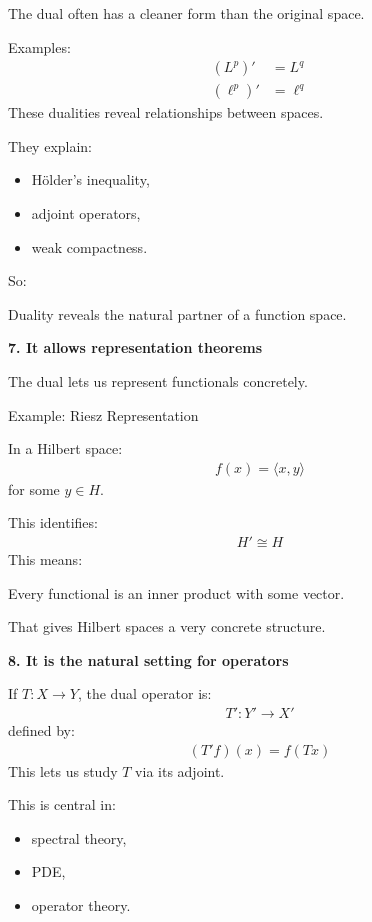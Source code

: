 \begin{description}
The dual often has a cleaner form than the original space.

Examples:
\begin{align*}
(L^p)'&=L^q\\
(\ell^p)'&=\ell^q
\end{align*}
These dualities reveal relationships between spaces.

They explain:
	\begin{itemize}
    \item Hölder’s inequality,
    \item adjoint operators,
    \item weak compactness.
	\end{itemize}

So:

\> Duality reveals the natural partner of a function space.

\item \textbf{7. It allows representation theorems}

The dual lets us represent functionals concretely.

\>\>  Example: Riesz Representation

In a Hilbert space:
\begin{align*}
f(x)=\langle x,y\rangle
\end{align*}
for some $y\in H$.

This identifies:
\begin{align*}
H'\cong H
\end{align*}
This means:

\> Every functional is an inner product with some vector.

That gives Hilbert spaces a very concrete structure.

\item \textbf{8. It is the natural setting for operators}

If $T:X\to Y$, the dual operator is:
\begin{align*}
T':Y'\to X'
\end{align*}
defined by:
\begin{align*}
(T'f)(x)=f(Tx)
\end{align*}
This lets us study $T$ via its adjoint.

This is central in:

	\begin{itemize}
    \item spectral theory,
    \item PDE,
    \item operator theory.
	\end{itemize}


\end{description}
